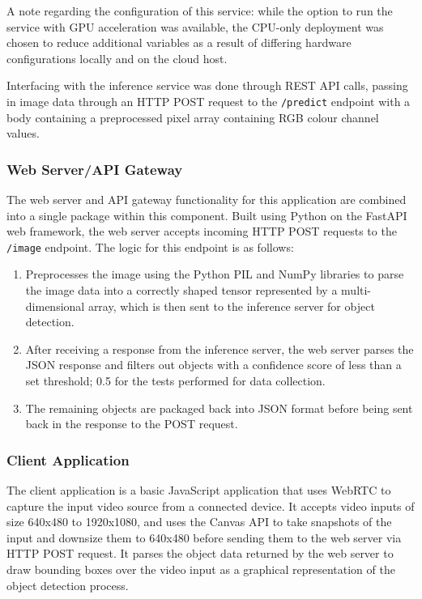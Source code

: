 \documentclass[11pt]{article}
\begin{document}
A note regarding the configuration of this service: while the option to run the service with GPU 
acceleration was available, the CPU-only deployment was chosen to reduce additional variables 
as a result of differing hardware configurations locally and on the cloud host.\newline

Interfacing with the inference service was done through REST API calls, passing in image data
through an HTTP POST request to the \lstinline|/predict| endpoint with a body containing a 
preprocessed pixel array containing RGB colour channel values. 

\subsubsection{Web Server/API Gateway}
The web server and API gateway functionality for this application are combined into a single
package within this component. Built using Python on the FastAPI web framework, the web server
accepts incoming HTTP POST requests to the \lstinline|/image| endpoint. The logic for this endpoint 
is as follows:

\begin{enumerate}
    \item {
        Preprocesses the image using the Python PIL and NumPy libraries to parse the image data 
        into a correctly shaped tensor represented by a multi-dimensional array, which is then 
        sent to the inference server for object detection.
    }
    \item {
        After receiving a response from the inference server, the web server parses the JSON 
        response and filters out objects with a confidence score of less than a set threshold; 
        0.5 for the tests performed for data collection.
    }
    \item {
        The remaining objects are packaged back into JSON format before being sent back in the
        response to the POST request.
    }
\end{enumerate}

\subsubsection{Client Application}
The client application is a basic JavaScript application that uses WebRTC to capture the input
video source from a connected device. It accepts video inputs of size 640x480 to 1920x1080, and 
uses the Canvas API to take snapshots of the input and downsize them to 640x480 before sending
them to the web server via HTTP POST request. It parses the object data returned by the web server
to draw bounding boxes over the video input as a graphical representation of the object detection
process.\newline
\end{document}
